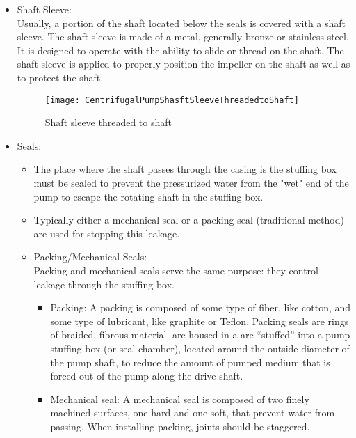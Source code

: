 \begin{itemize}
\item Shaft Sleeve: \\
Usually, a portion of the shaft located below the seals is covered with a shaft sleeve. The shaft sleeve is made of a metal, generally bronze or stainless steel. It is designed to operate with the ability to slide or thread on the shaft. The shaft sleeve is applied to properly position the impeller on the shaft as well as to protect the shaft.

\begin{figure}[hbt!]
\begin{center}
\texttt{[image: CentrifugalPumpShasftSleeveThreadedtoShaft]}
\caption{Shaft sleeve threaded to shaft}
\end{center}
\end{figure}

\item Seals:\\
\begin{itemize}
\item The place where the shaft passes through the casing is the stuffing box must be sealed to prevent the pressurized water from the "wet" end of the pump to escape the rotating shaft in the stuffing box.

\item Typically either a mechanical seal or a packing seal (traditional method) are used for stopping this leakage. 

\item Packing/Mechanical Seals:\\
Packing and mechanical seals serve the same purpose: they control leakage through the stuffing box. 

\begin{itemize} 
\item Packing:  A packing is composed of some type of fiber, like cotton, and some type of lubricant, like graphite or Teflon. Packing seals are rings of braided, fibrous material.  are housed in a are “stuffed” into a pump stuffing box (or seal chamber), located around the outside diameter of the pump shaft, to reduce the amount of pumped medium that is forced out of the pump along the drive shaft.
\item Mechanical seal:  A mechanical seal is composed of two finely machined surfaces, one hard and one soft, that prevent water from passing. When installing packing, joints should be staggered.
\end{itemize}



\end{itemize}
\end{itemize}
